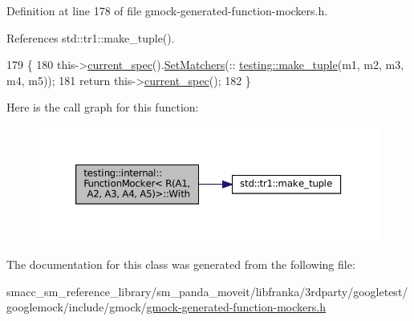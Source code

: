 Definition at line 178 of file gmock-\/generated-\/function-\/mockers.\+h.



References std\+::tr1\+::make\+\_\+tuple().


\begin{DoxyCode}
179                                                                            \{
180     this->\hyperlink{classtesting_1_1internal_1_1FunctionMockerBase_a744318106e20b346f4f1efbf5a601644}{current\_spec}().\hyperlink{classtesting_1_1internal_1_1MockSpec_a6b4fd303136c6282b19ddb16100f02a2}{SetMatchers}(::
      \hyperlink{namespacestd_1_1tr1_af7e12a0f5b5791b5b7c49a5a17b85359}{testing::make\_tuple}(m1, m2, m3, m4, m5));
181     \textcolor{keywordflow}{return} this->\hyperlink{classtesting_1_1internal_1_1FunctionMockerBase_a744318106e20b346f4f1efbf5a601644}{current\_spec}();
182   \}
\end{DoxyCode}
Here is the call graph for this function\+:
\nopagebreak
\begin{figure}[H]
\begin{center}
\leavevmode
\includegraphics[width=350pt]{classtesting_1_1internal_1_1FunctionMocker_3_01R_07A1_00_01A2_00_01A3_00_01A4_00_01A5_08_4_a719a0f9a249c92c3b990f5ea380899ff_cgraph}
\end{center}
\end{figure}


The documentation for this class was generated from the following file\+:\begin{DoxyCompactItemize}
\item 
smacc\+\_\+sm\+\_\+reference\+\_\+library/sm\+\_\+panda\+\_\+moveit/libfranka/3rdparty/googletest/googlemock/include/gmock/\hyperlink{gmock-generated-function-mockers_8h}{gmock-\/generated-\/function-\/mockers.\+h}\end{DoxyCompactItemize}
